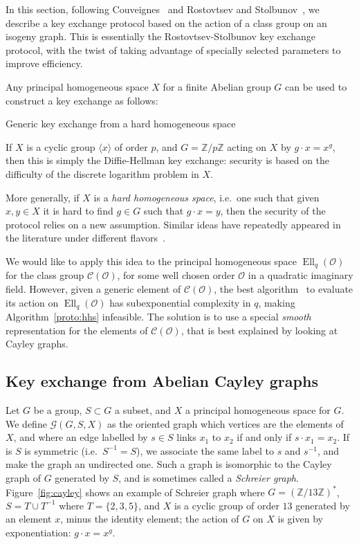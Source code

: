 \documentclass{article}
\newcommand{\Cl}{\mathcal{C}}
\newcommand{\Graph}{\mathcal{G}}
\renewcommand{\O}{\mathcal{O}}
\theoremstyle{definition}
\DeclareMathOperator{\Ell}{Ell}
\begin{document}
In this section, following Couveignes~\cite{cryptoeprint:2006:291} and
Rostovtsev and Stolbunov~\cite{rostovtsev+stolbunov06}, we describe a
key exchange protocol based on the action of a class group on an
isogeny graph.  This is essentially the Rostovtsev-Stolbunov key
exchange protocol, with the twist of taking advantage of specially
selected parameters to improve efficiency.

Any principal homogeneous space $X$ for a finite Abelian group $G$ can
be used to construct a key exchange as follows:

\begin{algorithm}
  \caption{Generic key exchange from a hard homogeneous space}
  \label{proto:hhs}
\end{algorithm}

If $X$ is a cyclic group $〈x〉$ of order $p$, and $G=ℤ/pℤ$ acting on
$X$ by $g·x=x^g$, then this is simply the Diffie-Hellman key exchange:
security is based on the difficulty of the discrete logarithm problem
in $X$.

More generally, if $X$ is a \emph{hard homogeneous space}, i.e.\ one
such that given $x,y∈X$ it is hard to find $g∈G$ such that $g·x=y$,
then the security of the protocol relies on a new assumption. Similar
ideas have repeatedly appeared in the literature under different
flavors~\cite{10.1007/3-540-44598-6_10,monico2007}.

We would like to apply this idea to the principal homogeneous space
$\Ell_q(\O)$ for the class group $\Cl(\O)$, for some well chosen order
$\O$ in a quadratic imaginary field. However, given a generic element
of $\Cl(\O)$, the best algorithm~\cite{jao+soukharev10} to evaluate
its action on $\Ell_q(\O)$ has subexponential complexity in $q$,
making Algorithm~\ref{proto:hhs} infeasible. The solution is to use a
special \emph{smooth} representation for the elements of $\Cl(\O)$,
that is best explained by looking at Cayley graphs.


\subsection{Key exchange from Abelian Cayley graphs}

Let $G$ be a group, $S⊂G$ a subset, and $X$ a principal homogeneous
space for $G$. We define $\Graph(G, S, X)$ as the oriented graph which
vertices are the elements of $X$, and where an edge labelled by $s∈S$
links $x_1$ to $x_2$ if and only if $s\cdot x_1 = x_2$.  If is $S$ is
symmetric (i.e.\ $S^{-1}=S$), we associate the same label to $s$ and
$s^{-1}$, and make the graph an undirected one. Such a graph is
isomorphic to the Cayley graph of $G$ generated by $S$, and is
sometimes called a \emph{Schreier graph}.  Figure~\ref{fig:cayley}
shows an example of Schreier graph where $G=(ℤ/13ℤ)^*$, $S=T∪T^{-1}$
where $T=\{2,3,5\}$, and $X$ is a cyclic group of order $13$ generated
by an element $x$, minus the identity element; the action of $G$ on
$X$ is given by exponentiation: $g·x=x^g$.
\end{document}
